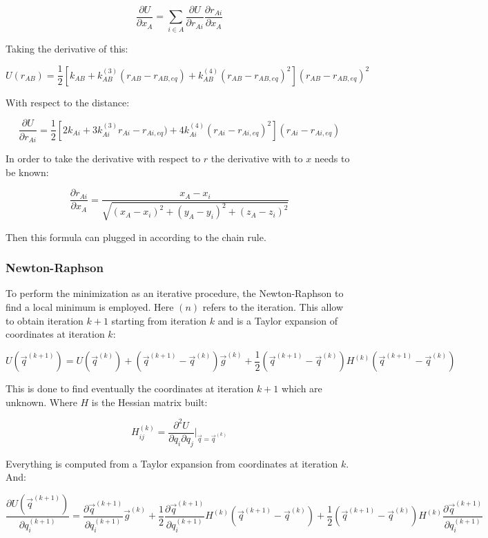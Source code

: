 	$$\frac{\partial U}{\partial x_A} = \sum\limits_{i\in A}\frac{\partial U}{\partial r_{Ai}}\frac{\partial r_{Ai}}{\partial x_A}$$

	Taking the derivative of this:

	$$U(r_{AB}) = \frac{1}{2}[k_{AB}+k_{AB}^{(3)}(r_{AB}-r_{AB, eq}) + k_{AB}^{(4)}(r_{AB}-r_{AB, eq})^2](r_{AB}-r_{AB,eq})^2$$

	With respect to the distance:

	$$\frac{\partial U}{\partial r_{Ai}} = \frac{1}{2}[2k_{Ai}+3k_{Ai}^{(3)}r_{Ai}-r_{Ai, eq}) + 4k^{(4)}_{Ai}(r_{Ai}-r_{Ai, eq})^2](r_{Ai}-r_{Ai, eq})$$

	In order to take the derivative with respect to $r$ the derivative with to $x$ needs to be known:

	$$\frac{\partial r_{Ai}}{\partial x_A} = \frac{x_A-x_i}{\sqrt{(x_A-x_i)^2+(y_A-y_i)^2+(z_A-z_i)^2}}$$

	Then this formula can plugged in according to the chain rule.

		\subsubsection{Newton-Raphson}
		To perform the minimization as an iterative procedure, the Newton-Raphson to find a local minimum is employed.
		Here $(n)$ refers to the iteration.
		This allow to obtain iteration $k+1$ starting from iteration $k$ and is a Taylor expansion of coordinates at iteration $k$:

		$$U(\vec{q}^{(k+1)}) = U(\vec{q}^{(k)}) + (\vec{q}^{(k+1)} -\vec{q}^{(k)})\vec{g}^{(k)} + \frac{1}{2}(\vec{q}^{(k+1)}-\vec{q}^{(k)})H^{(k)}(\vec{q}^{(k+1)}-\vec{q}^{(k)})$$

		This is done to find eventually the coordinates at iteration $k+1$ which are unknown.
		Where $H$ is the Hessian matrix built:

		$$H_{ij}^{(k)} = \frac{\partial^2 U}{\partial q_i\partial q_j}\biggr\vert_{\vec{q}=\vec{q}^{(k)}}$$

		Everything is computed from a Taylor expansion from coordinates at iteration $k$.
		And:

		$$\frac{\partial U(\vec{q}^{(k+1)})}{\partial q_i^{(k+1)}} = \frac{\partial \vec{q}^{(k+1)}}{\partial q_i^{(k+1)}}\vec{g}^{(k)}+ \frac{1}{2}\frac{\partial \vec{q}^{(k+1)}}{\partial q_i^{(k+1)}}H^{(k)}(\vec{q}^{(k+1)}-\vec{q}^{(k)})+\frac{1}{2}(\vec{q}^{(k+1)}-\vec{q}^{(k)})H^{(k)}\frac{\partial \vec{q}^{(k+1)}}{\partial q_i^{(k+1)}}$$


